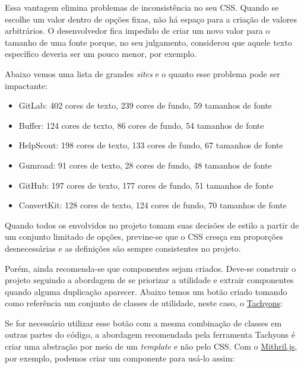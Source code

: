Essa vantagem elimina problemas de inconsistência no seu CSS. Quando se
escolhe um valor dentro de opções fixas, não há espaço para a criação de
valores arbitrários. O desenvolvedor fica impedido de criar um novo
valor para o tamanho de uma fonte porque, no seu julgamento, considerou
que aquele texto específico deveria ser um pouco menor, por exemplo.

Abaixo vemos uma lista de grandes \emph{sites} e o quanto esse problema
pode ser impactante\nocite{cssstats}:

\begin{itemize}
\tightlist
\item
  GitLab:
  402 cores de texto, 239 cores de fundo, 59 tamanhos de fonte
\item
  Buffer:
  124 cores de texto, 86 cores de fundo, 54 tamanhos de fonte
\item
  HelpScout:
  198 cores de texto, 133 cores de fundo, 67 tamanhos de fonte
\item
  Gumroad:
  91 cores de texto, 28 cores de fundo, 48 tamanhos de fonte
\item
  GitHub:
  197 cores de texto, 177 cores de fundo, 51 tamanhos de fonte
\item
  ConvertKit:
  128 cores de texto, 124 cores de fundo, 70 tamanhos de fonte
\end{itemize}

Quando todos os envolvidos no projeto tomam suas decisões de estilo a
partir de um conjunto limitado de opções, previne-se que o CSS cresça em
proporções desnecessárias e as definições são sempre consistentes no
projeto.

Porém, ainda recomenda-se que componentes sejam criados. Deve-se
construir o projeto seguindo a abordagem de se priorizar a utilidade e
extrair componentes quando alguma duplicação aparecer. Abaixo temos um
botão criado tomando como referência um conjunto de classes de
utilidade, neste caso, o \href{http://tachyons.io/}{Tachyons}:

\begin{Shaded}
\begin{Highlighting}[]
\KeywordTok{>} 
\end{Highlighting}
\end{Shaded}

Se for necessário utilizar esse botão com a mesma combinação de classes
em outras partes do código, a abordagem recomendada pela ferramenta
Tachyons é criar uma abstração por meio de um \emph{template} e não pelo
CSS. Com o \href{https://mithril.js.org/}{Mithril.js}, por exemplo,
podemos criar um componente para usá-lo assim:

